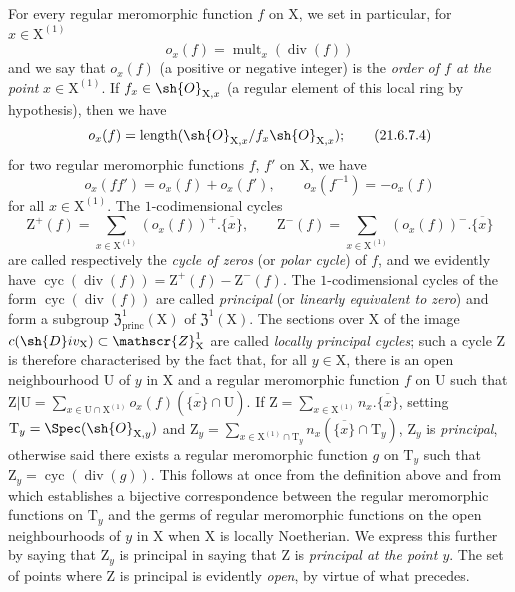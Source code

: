 \begin{env}[21.6.7]
For every regular meromorphic function $f$ on $\mathrm{X}$, we set in particular, for $x\in\mathrm{X}^{(1)}$
\[
\label{IV.21.6.7.3}
  o_x(f)=\operatorname{mult}_x(\operatorname{div}(f))
  \tag{21.6.7.3}
\]
and we say that $o_x(f)$ (a positive or negative integer) is the \emph{order of $f$ at the point} $x\in\mathrm{X}^{(1)}$.
If $f_x\in\sh{O}_{\mathrm{X},x}$ (a regular element of this local ring by hypothesis), then we have
\[
\label{IV.21.6.7.4}
  o_x(f)=\operatorname{length}(\sh{O}_{\mathrm{X},x}/f_x\sh{O}_{\mathrm{X},x});
  \tag{21.6.7.4}
\]
for two regular meromorphic functions $f$, $f'$ on $\mathrm{X}$, we have
\[
\label{IV.21.6.7.5}
  o_x(ff')=o_x(f)+o_x(f'),\qquad o_x(f^{-1})=-o_x(f)
  \tag{21.6.7.5}
\]
for all $x\in\mathrm{X}^{(1)}$.
The $1$-codimensional cycles
\[
  \mathrm{Z}^+(f)=\sum_{x\in\mathrm{X}^{(1)}}(o_x(f))^+.\overline{\{x\}},\qquad
  \mathrm{Z}^-(f)=\sum_{x\in\mathrm{X}^{(1)}}(o_x(f))^-.\overline{\{x\}}
\]
are called respectively the \emph{cycle of zeros} (or \emph{polar cycle}) of $f$, and we evidently have $\operatorname{cyc}(\operatorname{div}(f))=\mathrm{Z}^+(f)-\mathrm{Z}^-(f)$.
The $1$-codimensional cycles of the form $\operatorname{cyc}(\operatorname{div}(f))$ are called \emph{principal} (or \emph{linearly equivalent to zero}) and form a subgroup $\mathfrak{Z}^1_\mathrm{princ}(\mathrm{X})$ of $\mathfrak{Z}^1(\mathrm{X})$.
The sections over $\mathrm{X}$ of the image $c(\sh{D}iv_\mathrm{X})\subset\mathscr{Z}_\mathrm{X}^1$ are
called \emph{locally principal cycles};
such a cycle $\mathrm{Z}$ is therefore characterised by the fact that, for all $y\in\mathrm{X}$, there is an open neighbourhood $\mathrm{U}$ of $y$ in $\mathrm{X}$ and a regular meromorphic function $f$ on $\mathrm{U}$ such that $\mathrm{Z}|\mathrm{U}=\sum_{x\in\mathrm{U}\cap\mathrm{X}^{(1)}}o_x(f)(\overline{\{x\}}\cap\mathrm{U})$.
If $\mathrm{Z}=\sum_{x\in\mathrm{X}^{(1)}}n_x.\overline{\{x\}}$, setting $\mathrm{T}_y=\Spec(\sh{O}_{\mathrm{X},y})$ and $\mathrm{Z}_y=\sum_{x\in\mathrm{X}^{(1)}\cap\mathrm{T}_y}n_x(\overline{\{x\}}\cap\mathrm{T}_y)$, $\mathrm{Z}_y$ is \emph{principal}, otherwise said there exists a regular meromorphic function $g$ on $\mathrm{T}_y$ such that $\mathrm{Z}_y=\operatorname{cyc}(\operatorname{div}(g))$.
This follows at once from the definition above and from  which establishes a bijective correspondence between the regular meromorphic functions on $\mathrm{T}_y$ and the germs of regular meromorphic functions on the open neighbourhoods of $y$ in $\mathrm{X}$ when $\mathrm{X}$ is locally Noetherian.
We express this further by saying that $\mathrm{Z}_y$ is principal in saying that $\mathrm{Z}$ is \emph{principal at the point $y$}.
The set of points where $\mathrm{Z}$ is principal is evidently \emph{open}, by virtue of what precedes.


\end{env}

